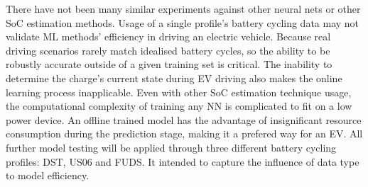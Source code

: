 There have not been many similar experiments against other neural nets or other SoC estimation methods.
Usage of a single profile's battery cycling data may not validate ML methods' efficiency in driving an electric vehicle.
Because real driving scenarios rarely match idealised battery cycles, so the ability to be robustly accurate outside of a given training set is critical.
The inability to determine the charge's current state during EV driving also makes the online learning process inapplicable.
Even with other SoC estimation technique usage, the computational complexity of training any NN is complicated to fit on a low power device.
An offline trained model has the advantage of insignificant resource consumption during the prediction stage, making it a prefered way for an EV.
All further model testing will be applied through three different battery cycling profiles: DST, US06 and FUDS.
It intended to capture the influence of data type to model efficiency.

